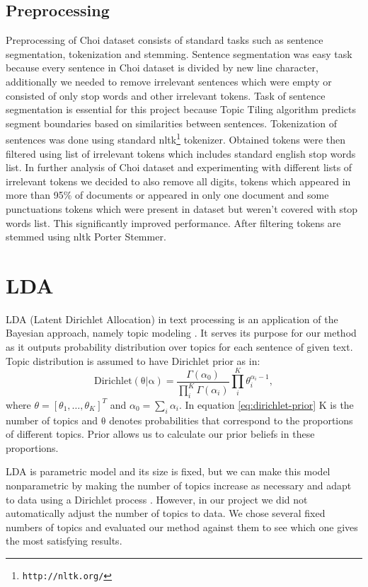 \documentclass[10pt, a4paper]{article}
\begin{document}
\subsection{Preprocessing}
Preprocessing of Choi dataset consists of standard tasks such as sentence segmentation, tokenization and stemming. Sentence segmentation was easy task because every sentence in Choi dataset is divided by new line character, additionally we needed to remove irrelevant sentences which were empty or consisted of only stop words and other irrelevant tokens. Task of sentence segmentation is essential for this project because Topic Tiling algorithm predicts segment boundaries based on similarities between sentences. Tokenization of sentences was done using standard nltk\footnote{\texttt{http://nltk.org/}} tokenizer. Obtained tokens were then filtered using list of irrelevant tokens which includes standard english stop words list. In further analysis of Choi dataset and experimenting with different lists of irrelevant tokens we decided to also remove all digits, tokens which appeared in more than 95\% of documents or appeared in only one document and some punctuations tokens which were present in dataset but weren't covered with stop words list. This significantly improved performance. After filtering tokens are stemmed using nltk Porter Stemmer. 


\section{LDA}
LDA (Latent Dirichlet Allocation) in text processing is an application of the Bayesian approach, namely topic modeling \citep{ml-book}. It serves its purpose for our method as it outputs probability distribution over topics for each sentence of given text. Topic distribution is assumed to have Dirichlet prior as in:
\begin{equation}\label{eq:dirichlet-prior}
\mathrm{Dirichlet(\theta|\alpha)} = \frac{\Gamma(\alpha_0)}{\prod_i^K \Gamma(\alpha_i)} \prod_i^K \theta_i^{\alpha_i-1},
\end{equation}
where $\theta=[\theta_1, \ldots, \theta_K]^T$ and $\alpha_0 = \sum_i \alpha_i$.
In equation \eqref{eq:dirichlet-prior} $\mathrm{K}$ is the number of topics and $\mathrm{\theta}$ denotes probabilities that correspond to the proportions of different topics. Prior allows us to calculate our prior beliefs in these proportions.

LDA is parametric model and its size is fixed, but we can make this model nonparametric by making the number of topics increase as necessary and adapt to data using a Dirichlet process \citep{ml-book}. However, in our project we did not automatically adjust the number of topics to data. We chose several fixed numbers of topics and evaluated our method against them to see which one gives the most satisfying results. 
\end{document}
